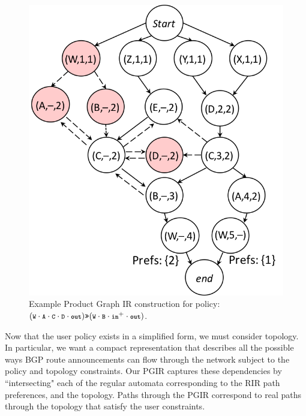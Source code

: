 \begin{figure}
\begin{minipage}[t]{.5\linewidth}
  \end{minipage}
  ~~
  ~~
  \begin{minipage}[t]{.5\linewidth}
  \vspace*{-1\baselineskip}
  \includegraphics[width=.65\columnwidth]{figures/productgraph}
  \end{minipage}

  \hrulefill
  \vspace*{.4em}

  \caption{Example Product Graph IR construction for policy: $(\CD{W} \cdot \CD{A} \cdot \CD{C} \cdot \CD{D} \cdot \Out) \Prefer (\CD{W} \cdot \CD{B} \cdot \In^+ \cdot \Out)$.}
  \label{fig:example-compilation}
  \vspace{-1em}
\end{figure}

Now that the user policy exists in a simplified form, we must consider topology. In particular, we want a compact representation that describes all the possible ways BGP route announcements can flow through the network subject to the policy and topology constraints. Our PGIR captures these dependencies by ``intersecting" each of the regular automata corresponding to the RIR path preferences, and the topology. Paths through the PGIR correspond to real paths through the topology that satisfy the user constraints.

